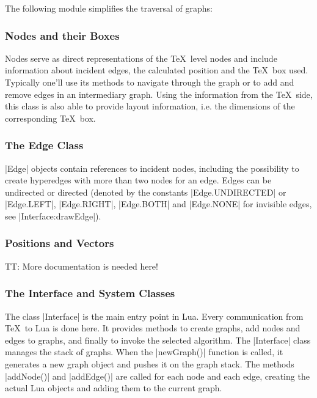 

The following module simplifies the traversal of graphs:





\subsubsection{Nodes and their Boxes}

Nodes serve as direct representations of the \TeX\ level nodes and
include information about incident edges, the calculated position and
the \TeX\ box used.  Typically one'll use its methods to navigate
through the graph or to add and remove edges in an intermediary graph.
Using the information from the \TeX\ side, this class is also able to
provide layout information, i.e. the dimensions of the corresponding
\TeX\ box.





\subsubsection{The Edge Class}

|Edge| objects contain references to incident nodes, including the
possibility to create hyperedges with more than two nodes for an edge.
Edges can be undirected or directed (denoted by the constants
|Edge.UNDIRECTED| or |Edge.LEFT|, |Edge.RIGHT|, |Edge.BOTH| and
|Edge.NONE| for invisible edges, see |Interface:drawEdge|). 




\subsubsection{Positions and Vectors}

TT: More documentation is needed here!

%



\subsubsection{The Interface and System Classes}

The class |Interface| is the main entry point in Lua. Every
communication from \TeX\ to Lua is done here. It provides methods to
create graphs, add nodes and edges to graphs, and finally to invoke the
selected algorithm. The |Interface| class manages the stack of
graphs. When the |newGraph()| function is called, it generates a new graph
object and pushes it on the graph stack. The methods |addNode()| and
|addEdge()| are called for each node and each edge, creating the
actual Lua objects and adding them to the current graph. 

